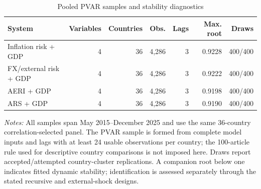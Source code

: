 \begin{table}[htbp]\centering\small\singlespacing
\caption{Pooled PVAR samples and stability diagnostics}\label{tab:model_diagnostics}
\setlength{\tabcolsep}{4pt}
\begin{tabular}{lrrrrrr}\toprule
System & Variables & Countries & Obs. & Lags & Max. root & Draws\\\midrule
Inflation risk + GDP & 4 & 36 & 4,286 & 3 & 0.9228 & 400/400\\
FX/external risk + GDP & 4 & 36 & 4,286 & 3 & 0.9222 & 400/400\\
AERI + GDP & 4 & 36 & 4,286 & 3 & 0.9198 & 400/400\\
ARS + GDP & 4 & 36 & 4,286 & 3 & 0.9190 & 400/400\\
\bottomrule\end{tabular}
\par\medskip\raggedright\footnotesize\textit{Notes:} All samples span May 2015--December 2025 and use the same 36-country correlation-selected panel. The PVAR sample is formed from complete model inputs and lags with at least 24 usable observations per country; the 100-article rule used for descriptive country comparisons is not imposed here. Draws report accepted/attempted country-cluster replications. A companion root below one indicates fitted dynamic stability; identification is assessed separately through the stated recursive and external-shock designs.
\end{table}